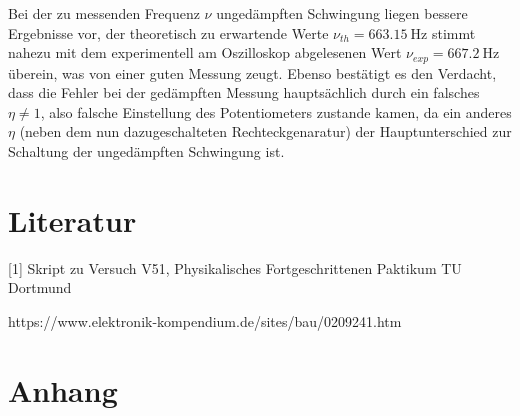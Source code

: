\documentclass{scrartcl}
\begin{document}
\begin{itemize}
Bei der zu messenden Frequenz $\nu$ ungedämpften Schwingung liegen bessere Ergebnisse vor, der theoretisch zu erwartende Werte $\nu_{th}=\SI{663,15}{\hertz}$ stimmt nahezu mit dem experimentell am Oszilloskop abgelesenen Wert $\nu_{exp}=\SI{667,2}{\hertz}$ überein, was von einer guten Messung zeugt.
Ebenso bestätigt es den Verdacht, dass die Fehler bei der gedämpften Messung hauptsächlich durch ein falsches $\eta \neq 1$, also falsche Einstellung des Potentiometers zustande kamen, da ein anderes $\eta$ (neben dem nun dazugeschalteten Rechteckgenaratur) der Hauptunterschied zur Schaltung der ungedämpften Schwingung ist.



\end{itemize}


\section{Literatur}

[1] Skript zu Versuch V51, Physikalisches Fortgeschrittenen Paktikum TU Dortmund

\noindent
[2] https://www.elektronik-kompendium.de/sites/bau/0209241.htm


\section{Anhang}
\end{document}
